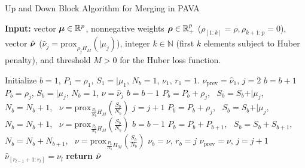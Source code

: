 \begin{algorithm}[hb]
    \caption{Up and Down Block Algorithm for Merging in PAVA}
    \label{alg:up_and_down_block_algorithm_for_merging_in_PAVA}
    \begin{flushleft}
    \textbf{Input:} vector $\bm{\mu} \in \mathbb{R}^p$, nonnegative weights $\bm{\rho} \in \mathbb{R}_{+}^p$ ($\rho_{[1:k]}=\rho, \rho_{k+1:p}=0$), vector $\hat{\bm{\nu}}$ ($\hat{\nu}_j = \text{prox}_{\rho_j H_M}(\vert{\mu_j})$), integer $k \in \mathbb{N}$ (first $k$ elements subject to Huber penalty), and threshold $M > 0$ for the Huber loss function. %
    \end{flushleft}
    \begin{algorithmic}[1]
        \STATE {}
        \STATE Initialize $b=1$, $P_1 = \rho_1$, $S_1 = \vert{\mu_1}$, $N_b=1$, $\nu_1$, $r_1 = 1$.
        \STATE $\nu_{\text{prev}} = \hat{\nu}_1$, $j=2$
            \STATE $b = b + 1$
            \STATE $P_b = \rho_j$, $S_b = \vert{\mu_j}$, $N_b=1$, $\nu = \hat{\nu}_j$
            \STATE {}
                \STATE $b = b - 1$
                \STATE $P_b = P_b + \rho_j$, \, $S_b = S_b + \vert{\mu_j}$, \, $N_b = N_b + 1$, \, $\nu = \text{prox}_{\frac{P_b}{N_b} H_{M}}(\frac{S_b}{N_b})$
                \STATE {}
                    \STATE $j = j + 1$
                    \STATE $P_b = P_b + \rho_j$, \, $S_b = S_b + \vert{\mu_j}$, \, $N_b = N_b + 1$, \, $\nu = \text{prox}_{\frac{P_b}{N_b} H_{M}}(\frac{S_b}{N_b})$
                \ENDWHILE
                \STATE {}
                    \STATE $b = b - 1$
                    \STATE $P_b = P_b + P_{b+1}$, \, $S_b = S_b + S_{b+1}$, \, $N_b = N_b + N_{b+1}$, \, $\nu = \text{prox}_{\frac{P_b}{N_b} H_{M}}(\frac{S_b}{N_b})$
                \ENDWHILE
            \ENDIF
            \STATE {}
            \STATE $\nu_b = \nu$, $r_b = j$
            \STATE {}
            \STATE $\nu_{\text{prev}} = \nu$, $j = j + 1$
        \ENDWHILE
        \STATE {}
            \STATE $\hat{\nu}_{[r_{l-1}+1:r_l]} = \nu_l$
        \ENDFOR
        \STATE \textbf{return} $\hat{\bm{\nu}}$
    \end{algorithmic}
\end{algorithm}

